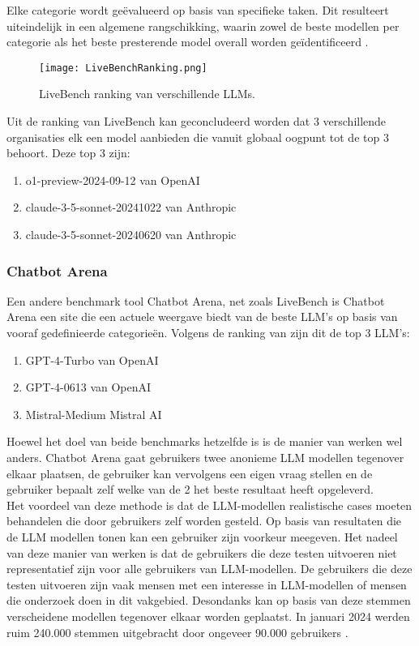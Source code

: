 Elke categorie wordt geëvalueerd op basis van specifieke taken. Dit resulteert uiteindelijk in een algemene rangschikking, waarin zowel de beste modellen per categorie als het beste presterende model overall worden geïdentificeerd \autocite{livebench}.

\begin{figure}[H]
    \centering
    \texttt{[image: LiveBenchRanking.png]}
    \caption{LiveBench ranking van verschillende LLMs.}
    \label{fig:livebench}
\end{figure}

Uit de ranking van LiveBench kan geconcludeerd worden dat 3 verschillende organisaties elk een model aanbieden die vanuit globaal oogpunt tot de top 3 behoort. Deze top 3 zijn: 
\begin{enumerate}
    \item o1-preview-2024-09-12 van OpenAI
    \item claude-3-5-sonnet-20241022 van Anthropic
    \item claude-3-5-sonnet-20240620 van Anthropic
\end{enumerate}

\subsubsection{Chatbot Arena} 

Een andere benchmark tool Chatbot Arena, net zoals LiveBench is Chatbot Arena een site die een actuele weergave biedt van de beste LLM's op basis van vooraf gedefinieerde categorieën. 
Volgens de ranking van \textcite{chiang2024chatbotarenaopenplatform} zijn dit de top 3 LLM's:

\begin{enumerate}
    \item GPT-4-Turbo van OpenAI
    \item GPT-4-0613 van OpenAI
    \item Mistral-Medium Mistral AI
\end{enumerate}

Hoewel het doel van beide benchmarks hetzelfde is is de manier van werken wel anders. Chatbot Arena gaat gebruikers twee anonieme LLM modellen tegenover elkaar plaatsen, de gebruiker kan vervolgens een eigen vraag stellen en de gebruiker bepaalt zelf welke van de 2 het beste resultaat heeft opgeleverd.
\\[1em]
Het voordeel van deze methode is dat de LLM-modellen realistische cases moeten behandelen die door gebruikers zelf worden gesteld. Op basis van resultaten die de LLM modellen tonen kan een gebruiker zijn voorkeur meegeven. Het nadeel van deze manier van werken is dat de gebruikers die deze testen uitvoeren niet representatief zijn voor alle gebruikers van LLM-modellen. De gebruikers die deze testen uitvoeren zijn vaak mensen met een interesse in LLM-modellen of mensen die onderzoek doen in dit vakgebied. Desondanks kan op basis van deze stemmen verscheidene modellen tegenover elkaar worden geplaatst. In januari 2024 werden ruim 240.000 stemmen uitgebracht door ongeveer 90.000 gebruikers \autocite{chiang2024chatbotarenaopenplatforms}. 

